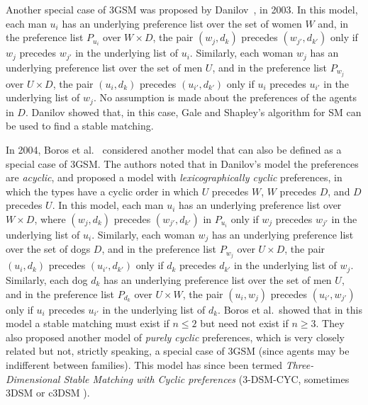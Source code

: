Another special case of 3GSM was proposed by Danilov~\cite{Dan02}, in 2003. In this model, each man $u_i$ has an underlying preference list over the set of women $W$ and, in the preference list $P_{u_i}$ over $W \times D$, the pair $( w_j, d_k )$ precedes $( w_{j'}, d_{k'} )$ only if $w_{j}$ precedes $w_{j'}$ in the underlying list of $u_i$. Similarly, each woman $w_j$ has an underlying preference list over the set of men $U$, and in the preference list $P_{w_j}$ over $U \times D$, the pair $( u_i, d_k )$ precedes $( u_{i'}, d_{k'} )$ only if $u_{i}$ precedes $u_{i'}$ in the underlying list of $w_j$. No assumption is made about the preferences of the agents in $D$. Danilov showed that, in this case, Gale and Shapley's algorithm for SM can be used to find a stable matching.

In 2004, Boros et al.~\cite{BGJK04} considered another model that can also be defined as a special case of 3GSM. The authors noted that in Danilov's model the preferences are \emph{acyclic}, and proposed a model with \emph{lexicographically cyclic} preferences, in which the types have a cyclic order in which $U$ precedes $W$, $W$ precedes $D$, and $D$ precedes $U$. In this model, each man $u_i$ has an underlying preference list over $W\times D$, where $(w_j, d_k)$ precedes $(w_{j'}, d_{k'})$ in $P_{u_i}$ only if $w_j$ precedes $w_{j'}$ in the underlying list of $u_i$. Similarly, each woman $w_j$ has an underlying preference list over the set of dogs $D$, and in the preference list $P_{w_j}$ over $U \times D$, the pair $( u_i, d_k )$ precedes $( u_{i'}, d_{k'} )$ only if $d_k$ precedes $d_{k'}$ in the underlying list of $w_j$. Similarly, each dog $d_k$ has an underlying preference list over the set of men $U$, and in the preference list $P_{d_k}$ over $U \times W$, the pair $( u_i, w_j )$ precedes $( u_{i'}, w_{j'} )$ only if $u_i$ precedes $u_{i'}$ in the underlying list of $d_k$. Boros et al.\ showed that in this model a stable matching must exist if $n \leq 2$ but need not exist if $n \geq 3$. They also proposed another model of \emph{purely cyclic} preferences, which is very closely related but not, strictly speaking, a special case of 3GSM (since agents may be indifferent between families). This model has since been termed \emph{Three-Dimensional Stable Matching with Cyclic preferences} (3-DSM-CYC, sometimes 3DSM \cite{BM10} or c3DSM \cite{Pashkovich20}).

